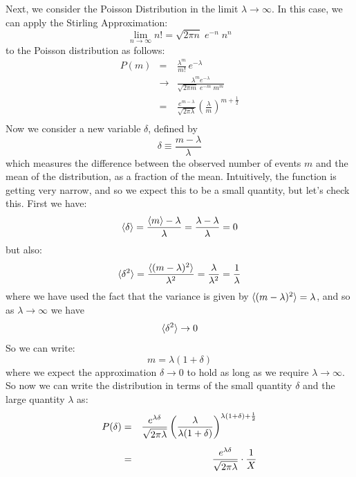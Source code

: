 \documentclass[12pt]{article}
\begin{document}
Next, we consider the Poisson Distribution in the limit $\lambda \to \infty$.  In this case, we can apply the Stirling Approximation:
\begin{displaymath}
\lim_{n \to \infty} n! = \sqrt{2 \pi n} \; e^{-n} \; n^n
\end{displaymath}
to the Poisson distribution as follows:
\begin{eqnarray*}
P(m) &=& \frac{\lambda^m}{m!} \, e^{-\lambda} \\[5pt]
 &\to& \frac{\lambda^m e^{-\lambda}}{\sqrt{2 \pi m} \; e^{-m} \; m^m} \\[5pt]
 &=& \frac{e^{m-\lambda}}{\sqrt{2\pi\lambda}} \left( \frac{\lambda}{m}\right)^{m+\frac{1}{2}}\\
\end{eqnarray*}
Now we consider a new variable $\delta$, defined by
\begin{displaymath}
\delta \equiv \frac{m-\lambda}{\lambda}
\end{displaymath}
which measures the difference between the observed number of events $m$ and the mean of the distribution, as a fraction of the mean.  Intuitively, the function is getting very narrow, and so we expect this to be a small quantity, but let's check this.  First we have:
\begin{displaymath}
\braket{\delta} = \frac{\braket{m}- \lambda}{\lambda} = \frac{\lambda - \lambda}{\lambda} = 0
\end{displaymath}
but also:
\begin{displaymath}
\braket{\delta^2} = \frac{\braket{(m-\lambda)^2}}{\lambda^2} = \frac{\lambda}{\lambda^2} = \frac{1}{\lambda}
\end{displaymath}
where we have used the fact that the variance is given by $\braket{(m-\lambda)^2} = \lambda$, and so as $\lambda \to \infty $ we have
\begin{displaymath}
\braket{\delta^2} \to 0
\end{displaymath}
So we can write:
\begin{equation} \label{eqn:mdef}
m = \lambda (1 + \delta)
\end{equation}
where we expect the approximation $\delta \to 0$ to hold as long as we require $\lambda \to \infty$.  So now we can write the distribution in terms of the small quantity $\delta$ and the large quantity $\lambda$ as:
\begin{eqnarray}
\label{eqn:pdelt}
P(\delta) &=& \frac{e^{\lambda\delta}}{\sqrt{2\pi\lambda}} \left( \frac{\lambda}{\lambda (1+\delta)} \right)^{\lambda(1+\delta)+\frac{1}{2}} \notag \\[5pt]
 &=& \frac{e^{\lambda\delta}}{\sqrt{2\pi\lambda}} \cdot \frac{1}{X}
\end{eqnarray}
\end{document}
